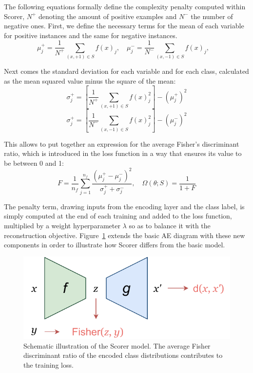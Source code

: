 \documentclass[
	fontsize=11pt, %
	twoside=false, %
	open=any, %
	secnumdepth=1, %
]{kaobook}
\newcommand{\change}[1]{{\color{blue}#1}}
\renewcommand{\change}[1]{#1}
\begin{document}
The following equations formally define the complexity penalty computed within Scorer, $N^+$ denoting the amount of positive examples and $N^-$ the number of negative ones. First, we define the necessary terms for the mean of each variable for positive instances and the same for negative instances.
\begin{equation} \mu_j^+ = \frac 1 {N^+} \sum_{(x,+1)\in S} f(x)_j,\quad \mu_j^- = \frac 1 {N^-} \sum_{(x,-1)\in S} f(x)_j,\quad\end{equation}

Next comes the standard deviation for each variable and for each class, calculated as the mean squared value minus the square of the mean:
\begin{equation}\sigma_j^+ = \left[\frac 1 {N^+} \sum_{(x,+1)\in S} f(x)_j^2\right] - (\mu_j^+)^2 \end{equation}
\begin{equation}\sigma_j^+ = \left[\frac 1 {N^-} \sum_{(x,-1)\in S} f(x)_j^2\right] - (\mu_j^-)^2 \end{equation}

This allows to put together an expression for the average Fisher's discriminant ratio, which is introduced in the loss function in a way that ensures its value to be between 0 and 1:
\begin{equation}F=\frac{1}{n_f}\sum_{j=1}^{n_f} \frac{(\mu_j^+-\mu_j^-)^2}{\sigma_j^++\sigma_j^-},\quad\Omega(\theta;S)=\frac{1}{1 + F}\end{equation}

The penalty term, drawing inputs from the encoding layer and the class label, is simply computed at the end of each training and added to the loss function, multiplied by a weight hyperparameter $\lambda$ so as to balance it with the reconstruction objective. Figure~\ref{fig.scorer} extends the basic AE diagram with these new components in order to illustrate how Scorer differs from the basic model.


\begin{figure}[ht]
  \centering
  \includegraphics[width=.35\textwidth]{scorer.pdf}
  \caption{\label{fig.scorer}\change{Schematic illustration of the Scorer model. The average Fisher discriminant ratio of the encoded class distributions contributes to the training loss.}}
\end{figure}
\end{document}
